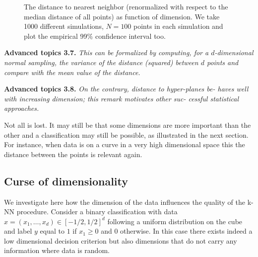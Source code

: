 \begin{figure}[h]\centering
\caption{The distance to nearest neighbor (renormalized with respect to the
median distance of all points) as function of dimension. We take 1000 different
simulations, $N = 100$ points in each simulation and plot the empirical 99\%
confidence interval too.}\label{fig:ch3-min-distance}
\end{figure}

\begin{tcolorbox}[advancedbox]
\textbf{Advanced topics 3.7.} \textit{This can be formalized by computing, for a
$d$-dimensional normal sampling, the variance of the distance (squared)
between $d$ points and compare with the mean value of the distance.}
\end{tcolorbox}

\begin{tcolorbox}[advancedbox]
\textbf{Advanced topics 3.8.} \textit{On the contrary, distance to hyper-planes be-
haves well with increasing dimension; this remark motivates other suc-
cessful statistical approaches.}
\end{tcolorbox}

Not all is lost. It may still be that some dimensions are more important
than the other and a classification may still be possible, as illustrated in the
next section. For instance, when data is on a curve in a very high dimensional
space this the distance between the points is relevant again.

\subsection{Curse of dimensionality}
\label{sec:ch3-curse-dim}

We investigate here how the dimension of the data influences the quality of the
k-NN procedure. Consider a binary classification with data $x = (x_1, \ldots, x_d) \in
[-1/2, 1/2]^d$ following a uniform distribution on the cube and label $y$ equal to
$1$ if $x_1 \geq 0$ and $0$ otherwise. In this case there exists indeed a low dimensional
decision criterion but also dimensions that do not carry any information where
data is random.

